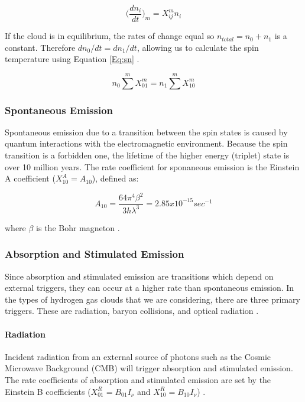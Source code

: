 \begin{equation} \label{Eq:dn}
\Big( \frac{d n_i}{dt} \Big)_m = X^m_{ij} n_i
\end{equation}

If the cloud is in equilibrium, the rates of change equal so $n_{total} = n_0 + n_1$ is a constant. Therefore $d n_0/dt = d n_1 /dt$, allowing us to calculate the spin temperature using Equation \ref{Eq:sn} \cite{field_1958}. 

\begin{equation} \label{Eq:sn}
n_0 \sum^m X^m_{01} = n_1 \sum^m X^m_{10}
\end{equation}

\subsubsection{Spontaneous Emission}

Spontaneous emission due to a transition between the spin states is caused by quantum interactions with the electromagnetic environment. Because the spin transition is a forbidden one, the lifetime of the higher energy (triplet) state is over 10 million years. The rate coefficient for sponaneous emission is the Einstein A coefficient ($X^A_{10} = A_{10}$), defined as:

\begin{equation}
A_{10} = \frac{64 \pi^4 \beta^2}{3 h \lambda^3} = 2.85 x 10^{-15} sec^{-1}
\end{equation}

where $\beta$ is the Bohr magneton \cite{field_1958}. 

\subsubsection{Absorption and Stimulated Emission}

Since absorption and stimulated emission are transitions which depend on external triggers, they can occur at a higher rate than spontaneous emission. In the types of hydrogen gas clouds that we are considering, there are three primary triggers. These are \cm radiation, baryon collisions, and optical radiation \cite{field_1958}. 

\paragraph{\cm Radiation}

Incident radiation from an external source of \cm photons such as the Cosmic Microwave Background (CMB) will trigger absorption and stimulated emission. The rate coefficients of absorption and stimulated emission are set by the Einstein B coefficients ($X^R_{01} = B_{01} I_\nu$ and $X^R_{10} = B_{10} I_{\nu}$) \cite{field_1958}. 

